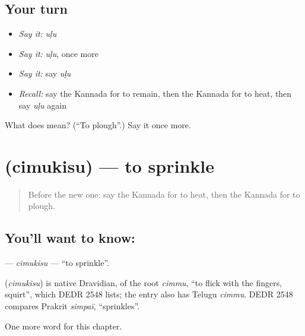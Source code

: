\subsection*{Your turn}
\begin{itemize}
\raggedright
  \item \emph{Say it:} \emph{uḷu}
  \item \emph{Say it:} \emph{uḷu}, once more
  \item \emph{Say it:} say \emph{uḷu}
  \item \emph{Recall:} say the Kannada for to remain, then the Kannada for to heat, then say \emph{uḷu} again
\end{itemize}

\begin{tcolorbox}[breakable,colback=teal!4,colframe=teal!35!black,title={Before you move on}]
What does  mean? (\textquotedblleft{}To plough\textquotedblright{}.) Say it once more.
\end{tcolorbox}
\section[\texorpdfstring{\kn{ಚಿಮುಕಿಸು} (cimukisu)}{ಚಿಮುಕಿಸು (cimukisu)}]{ (cimukisu) — to sprinkle}

\label{lesson:KA-C166-cimukisu}



\begin{quote}
Before the new one: say the Kannada for to heat, then the Kannada for to plough.
\end{quote}

\subsection*{You'll want to know: }
\textbf{} — \emph{cimukisu} — \textquotedblleft{}to sprinkle\textquotedblright{}.

\begin{cousinweb}
\textbf{} (\emph{cimukisu}) is native Dravidian, of the root \emph{cimmu}, \textquotedblleft{}to flick with the fingers, squirt\textquotedblright{}, which DEDR 2548 lists; the entry also has Telugu \emph{cimmu}. DEDR 2548 compares Prakrit \emph{simpaï}, \textquotedblleft{}sprinkles\textquotedblright{}.
\end{cousinweb}

\begin{grammarlens}[title={What you've built}]
One more word for this chapter.
\end{grammarlens}

